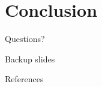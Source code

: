 \documentclass[11pt]{beamer}
\begin{document}



\section{Conclusion}

\begin{frame}
  Questions?
\end{frame}

\appendix

\begin{frame}[fragile]{Backup slides}

\end{frame}

\begin{frame}[allowframebreaks]{References}
  
  
\end{frame}
\end{document}

